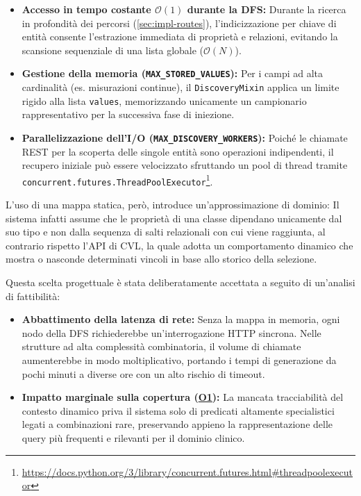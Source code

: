 \documentclass[12pt,a4paper,openright,twoside]{book}
\begin{document}
\begin{itemize}
    \item \textbf{Accesso in tempo costante $\mathcal{O}(1)$ durante la DFS:}
          Durante la ricerca in profondità dei percorsi
          (\cref{sec:impl-routes}), l'indicizzazione per chiave di entità
          consente l'estrazione immediata di proprietà e relazioni, evitando la
          scansione sequenziale di una lista globale ($\mathcal{O}(N)$).

    \item \textbf{Gestione della memoria (\texttt{MAX\_STORED\_VALUES}):} Per i
          campi ad alta cardinalità (es. misurazioni continue), il
          \texttt{DiscoveryMixin} applica un limite rigido alla lista
          \texttt{values}, memorizzando unicamente un campionario
          rappresentativo per la successiva fase di iniezione.


    \item \textbf{Parallelizzazione dell'I/O
              (\texttt{MAX\_DISCOVERY\_WORKERS}):} Poiché le chiamate REST per
          la scoperta delle singole entità sono operazioni indipendenti, il
          recupero iniziale può essere velocizzato sfruttando un pool di
          thread tramite
          \texttt{concurrent.futures.ThreadPoolExecutor}\footnote{\url{https://docs.python.org/3/library/concurrent.futures.html\#threadpoolexecutor}}.
\end{itemize}

L'uso di una mappa statica, però, introduce un'approssimazione di dominio: Il
sistema infatti assume che le proprietà di una classe dipendano unicamente dal
suo tipo e non dalla sequenza di salti relazionali con cui viene raggiunta, al
contrario rispetto l'API di CVL, la quale adotta un comportamento dinamico che
mostra o nasconde determinati vincoli in base allo storico della selezione.

Questa scelta progettuale è stata deliberatamente accettata a seguito di
un'analisi di fattibilità:

\begin{itemize}
    \item \textbf{Abbattimento della latenza di rete:} Senza la mappa in
          memoria, ogni nodo della DFS richiederebbe un'interrogazione HTTP
          sincrona. Nelle strutture ad alta complessità combinatoria, il volume
          di chiamate aumenterebbe in modo moltiplicativo, portando i tempi di
          generazione da pochi minuti a diverse ore con un alto rischio di
          timeout.

    \item \textbf{Impatto marginale sulla copertura (\hyperref[obj:O1]{O1}):} La
          mancata tracciabilità del contesto dinamico priva il sistema solo di
          predicati altamente specialistici legati a combinazioni rare,
          preservando appieno la rappresentazione delle query più frequenti e
          rilevanti per il dominio clinico.
\end{itemize}
\end{document}
